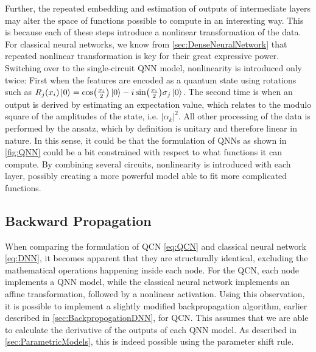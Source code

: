 Further, the repeated embedding and estimation of outputs of intermediate layers may alter the space of functions possible to compute in an interesting way. This is because each of these steps introduce a nonlinear transformation of the data. For classical neural networks, we know from \autoref{sec:DenseNeuralNetwork} that repeated nonlinear transformation is key for their great expressive power. Switching over to the single-circuit QNN model, nonlinearity is introduced only twice: First when the features are encoded as a quantum state using rotations such as $R_j(x_i)\ket{0} = \cos(\frac{x_i}{2})\ket{0} - i\sin(\frac{x_i}{2})\sigma_j\ket{0}$. The second time is when an output is derived by estimating an expectation value, which relates to the modulo square of the amplitudes of the state, i.e. $|\alpha_k|^2$. All other processing of the data is performed by the ansatz, which by definition is unitary and therefore linear in nature. In this sense, it could be that the formulation of QNNs as shown in \autoref{fig:QNN} could be a bit constrained with respect to what functions it can compute. By combining several circuits, nonlinearity is introduced with each layer, possibly creating a more powerful model able to fit more complicated functions.  



\subsection{Backward Propagation}\label{sec:BackwardPropagationQCN}
When comparing the formulation of QCN \autoref{eq:QCN} and classical neural network \autoref{eq:DNN}, it becomes apparent that they are structurally identical, excluding the mathematical operations happening inside each node. For the QCN, each node implements a QNN model, while the classical neural network implements an affine transformation, followed by a nonlinear activation. Using this observation, it is possible to implement a slightly modified backpropagation algorithm, earlier described in \autoref{sec:BackpropogationDNN}, for QCN. This assumes that we are able to calculate the derivative of the outputs of each QNN model. As described in \autoref{sec:ParametricModels}, this is indeed possible using the parameter shift rule. 

